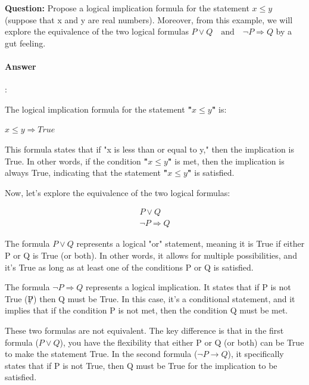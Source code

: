 \documentclass{article}
\begin{document}
\begin{tcolorbox}
  \textbf{Question:} Propose a logical implication formula for the statement $x \leq y$ (suppose that x and y are real numbers). Moreover, from this example, we will explore the equivalence of the two logical formulas $P \lor Q \quad \text{and} \quad \lnot P \Longrightarrow Q$ by a gut feeling.
\end{tcolorbox}

\paragraph{Answer}:

The logical implication formula for the statement \textbf{"$x \leq y$"} is:

$x \leq y \Rightarrow True$

This formula states that if "x is less than or equal to y," then the implication is True. In other words, if the condition  \textbf{"$x \leq y$"} is met, then the implication is always True, indicating that the statement \textbf{"$x \leq y$"} is satisfied.

Now, let's explore the equivalence of the two logical formulas:

\begin{equation*}
  \begin{aligned}
    P \lor Q \\
    \lnot P \Rightarrow Q
  \end{aligned}  
\end{equation*}

The formula $P \lor Q$ represents a logical "or" statement, meaning it is True if either P or Q is True (or both). In other words, it allows for multiple possibilities, and it's True as long as at least one of the conditions P or Q is satisfied.

The formula $\lnot P \Rightarrow Q$ represents a logical implication. It states that if P is not True ($\not P$) then Q must be True. In this case, it's a conditional statement, and it implies that if the condition P is not met, then the condition Q must be met.

These two formulas are not equivalent. The key difference is that in the first formula ($P \lor Q$), you have the flexibility that either P or Q (or both) can be True to make the statement True. In the second formula ($\lnot P \longrightarrow Q$), it specifically states that if P is not True, then Q must be True for the implication to be satisfied.
\end{document}
